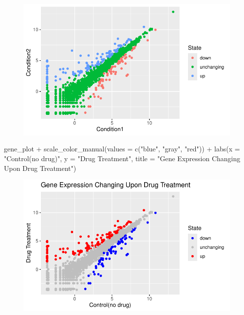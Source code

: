 \documentclass[
  letterpaper,
  DIV=11,
  numbers=noendperiod]{scrartcl}
\newenvironment{Shaded}{\begin{snugshade}}{\end{snugshade}}
\newcommand{\AttributeTok}[1]{\textcolor[rgb]{0.40,0.45,0.13}{#1}}
\newcommand{\FunctionTok}[1]{\textcolor[rgb]{0.28,0.35,0.67}{#1}}
\newcommand{\NormalTok}[1]{\textcolor[rgb]{0.00,0.23,0.31}{#1}}
\newcommand{\SpecialCharTok}[1]{\textcolor[rgb]{0.37,0.37,0.37}{#1}}
\newcommand{\StringTok}[1]{\textcolor[rgb]{0.13,0.47,0.30}{#1}}
\begin{document}
\begin{figure}[H]

{\centering \includegraphics{class05_files/figure-pdf/unnamed-chunk-12-1.pdf}

}

\end{figure}

\begin{Shaded}
\begin{Highlighting}[]
\NormalTok{gene\_plot }\SpecialCharTok{+} \FunctionTok{scale\_color\_manual}\NormalTok{(}\AttributeTok{values =} \FunctionTok{c}\NormalTok{(}\StringTok{"blue"}\NormalTok{, }\StringTok{"gray"}\NormalTok{, }\StringTok{"red"}\NormalTok{)) }\SpecialCharTok{+}
  \FunctionTok{labs}\NormalTok{(}\AttributeTok{x =} \StringTok{"Control(no drug)"}\NormalTok{, }\AttributeTok{y =} \StringTok{"Drug Treatment"}\NormalTok{, }\AttributeTok{title =} \StringTok{"Gene Expression Changing Upon Drug Treatment"}\NormalTok{)}
\end{Highlighting}
\end{Shaded}

\begin{figure}[H]

{\centering \includegraphics{class05_files/figure-pdf/unnamed-chunk-13-1.pdf}

}

\end{figure}
\end{document}
